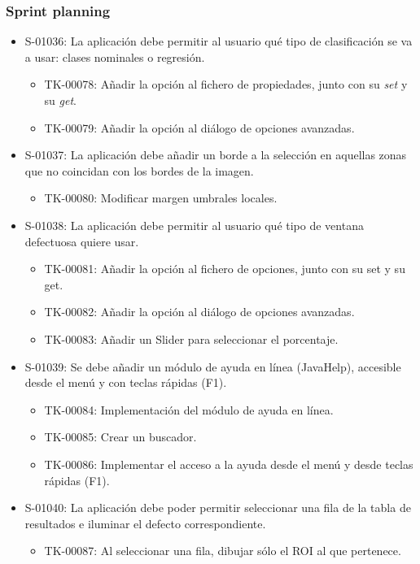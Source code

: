 \subsubsection*{Sprint planning}
\begin{itemize}
 \item S-01036: La aplicación debe permitir al usuario qué tipo de clasificación se va a usar: clases nominales o regresión.
  \begin{itemize}
   \item TK-00078: Añadir la opción al fichero de propiedades, junto con su \emph{set} y su \emph{get}.
   \item TK-00079: Añadir la opción al diálogo de opciones avanzadas.
  \end{itemize}
 \item S-01037: La aplicación debe añadir un borde a la selección en aquellas zonas que no coincidan con los bordes de la imagen.
  \begin{itemize}
   \item TK-00080: Modificar margen umbrales locales.
  \end{itemize}
 \item S-01038: La aplicación debe permitir al usuario qué tipo de ventana defectuosa quiere usar.
  \begin{itemize}
   \item TK-00081: Añadir la opción al fichero de opciones, junto con su set y su get.
   \item TK-00082: Añadir la opción al diálogo de opciones avanzadas.
   \item TK-00083: Añadir un Slider para seleccionar el porcentaje.
  \end{itemize}
 \item S-01039: Se debe añadir un módulo de ayuda en línea (JavaHelp), accesible desde el menú y con teclas rápidas (F1).
  \begin{itemize}
   \item TK-00084: Implementación del módulo de ayuda en línea.
   \item TK-00085: Crear un buscador.
   \item TK-00086: Implementar el acceso a la ayuda desde el menú y desde teclas rápidas (F1).
  \end{itemize}
 \item S-01040: La aplicación debe poder permitir seleccionar una fila de la tabla de resultados e iluminar el defecto correspondiente.
  \begin{itemize}
   \item TK-00087: Al seleccionar una fila, dibujar sólo el ROI al que pertenece.

\end{itemize}
\end{itemize}
